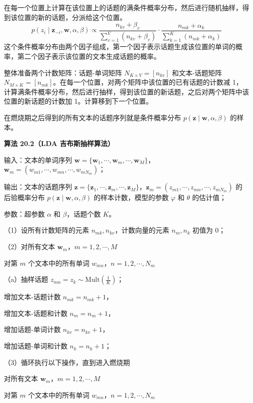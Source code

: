 \documentclass[UTF8, 12pt, fontset=fandol, oneside]{ctexart}
\begin{document}
在每一个位置上计算在该位置上的话题的满条件概率分布，然后进行随机抽样，得到该位置的新的话题，分派给这个位置。
\[
p(z_i\mid\mathbf{z}_{-i},\mathbf{w},\alpha,\beta)\propto \frac{n_{kv}+\beta_v}{\sum_{v=1}^V(n_{kv}+\beta_v)}\cdot \frac{n_{mk}+\alpha_k}{\sum_{k=1}^K(n_{mk}+\alpha_k)}
\]
这个条件概率分布由两个因子组成，第一个因子表示话题生成该位置的单词的概率，第二个因子表示该位置的文本生成话题的概率。

整体准备两个计数矩阵：话题-单词矩阵 $N_{K\times V}=[n_{kv}]$ 和文本-话题矩阵 $N_{M\times K}=[n_{mk}]$。在每一个位置，对两个矩阵中该位置的已有话题的计数减 1，计算满条件概率分布，然后进行抽样，得到该位置的新话题，之后对两个矩阵中该位置的新话题的计数加 1。计算移到下一个位置。

在燃烧期之后得到的所有文本的话题序列就是条件概率分布 $p(\mathbf{z}\mid\mathbf{w},\alpha,\beta)$ 的样本。

\noindent\textbf{算法 20.2（LDA 吉布斯抽样算法）}

输入：文本的单词序列 $\mathbf{w}=\{\mathbf{w}_1,\cdots,\mathbf{w}_m,\cdots,\mathbf{w}_M\}$，$\mathbf{w}_m=(w_{m1},\cdots,w_{mn},\cdots,w_{mN_m})$；

输出：文本的话题序列 $\mathbf{z}=\{\mathbf{z}_1,\cdots,\mathbf{z}_m,\cdots,\mathbf{z}_M\}$，$\mathbf{z}_m=(z_{m1},\cdots,z_{mn},\cdots,z_{mN_m})$ 的后验概率分布 $p(\mathbf{z}\mid\mathbf{w},\alpha,\beta)$ 的样本计数，模型的参数 $\varphi$ 和 $\theta$ 的估计值；

参数：超参数 $\alpha$ 和 $\beta$，话题个数 $K$。

（1）设所有计数矩阵的元素 $n_{mk},n_{kv}$，计数向量的元素 $n_m,n_k$ 初值为 0；

（2）对所有文本 $\mathbf{w}_m$，$m=1,2,\cdots,M$

\quad 对第 $m$ 个文本中的所有单词 $w_{mn}$，$n=1,2,\cdots,N_m$

\quad （a）抽样话题 $z_{mn}=z_k\sim \mathrm{Mult}\left(\frac{1}{K}\right)$；

\quad 增加文本-话题计数 $n_{mk}=n_{mk}+1$，

\quad 增加文本-话题和计数 $n_m=n_m+1$，

\quad 增加话题-单词计数 $n_{kv}=n_{kv}+1$，

\quad 增加话题-单词和计数 $n_k=n_k+1$；

（3）循环执行以下操作，直到进入燃烧期

\quad 对所有文本 $\mathbf{w}_m$，$m=1,2,\cdots,M$

\quad 对第 $m$ 个文本中的所有单词 $w_{mn}$，$n=1,2,\cdots,N_m$
\end{document}
